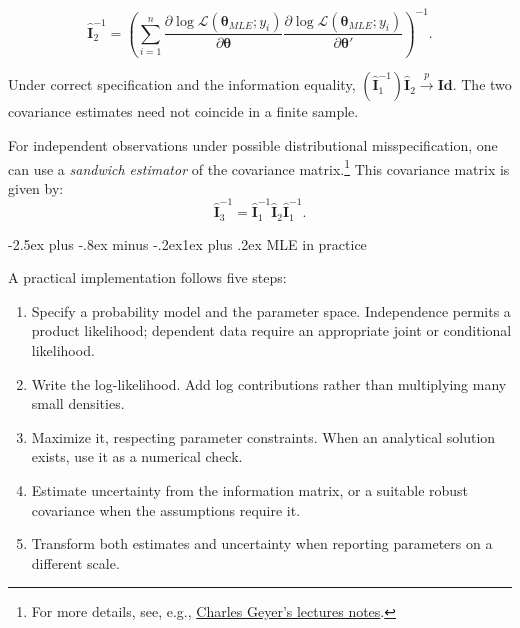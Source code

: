 \documentclass[
  11pt,
]{book}
\makeatletter
\providecommand{\tightlist}{%
  \setlength{\itemsep}{0pt}\setlength{\parskip}{0pt}}
\renewcommand\subsection{\@startsection{subsection}{2}{\z@}
  {-2.5ex plus -.8ex minus -.2ex}{1ex plus .2ex}
  {\normalfont\large\bfseries\color{TextbookInk}}}
\theoremstyle{definition}
\theoremstyle{definition}
\theoremstyle{definition}
\theoremstyle{definition}
\theoremstyle{remark}
\makeatother
\begin{document}
\begin{equation}
\hat{\mathbf{I}}_2^{-1} =  \left( \sum_{i=1}^n \frac{\partial \log \mathcal{L}({\boldsymbol\theta_{MLE}};y_i)}{\partial {\boldsymbol\theta}} \frac{\partial \log \mathcal{L}({\boldsymbol\theta_{MLE}};y_i)}{\partial {\boldsymbol\theta'}} \right)^{-1}.  \label{eq:I2}
\end{equation}

Under correct specification and the information equality, \((\hat{\mathbf{I}}_1^{-1})\hat{\mathbf{I}}_2\overset p\longrightarrow \mathbf{Id}\). The two covariance estimates need not coincide in a finite sample.

For independent observations under possible distributional misspecification, one can use a \emph{sandwich estimator} of the covariance matrix.\footnote{For more details, see, e.g., \href{https://www.stat.umn.edu/geyer/5601/notes/sand.pdf}{Charles Geyer's lectures notes}.} This covariance matrix is given by:
\begin{equation}
\hat{\mathbf{I}}_3^{-1} = \hat{\mathbf{I}}_1^{-1} \hat{\mathbf{I}}_2 \hat{\mathbf{I}}_1^{-1}.\label{eq:III3}
\end{equation}


\subsection{MLE in practice}\label{mle-in-practice}

A practical implementation follows five steps:

\begin{enumerate}
\def\labelenumi{\arabic{enumi}.}
\tightlist
\item
  Specify a probability model and the parameter space. Independence permits a product likelihood; dependent data require an appropriate joint or conditional likelihood.
\item
  Write the log-likelihood. Add log contributions rather than multiplying many small densities.
\item
  Maximize it, respecting parameter constraints. When an analytical solution exists, use it as a numerical check.
\item
  Estimate uncertainty from the information matrix, or a suitable robust covariance when the assumptions require it.
\item
  Transform both estimates and uncertainty when reporting parameters on a different scale.
\end{enumerate}
\end{document}
